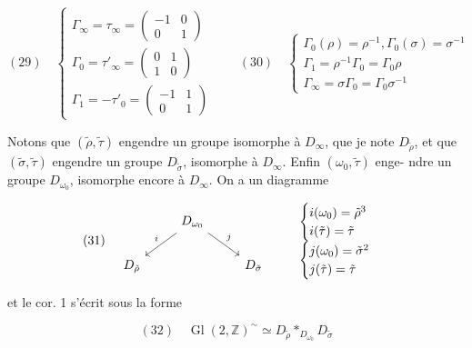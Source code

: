 $$
(29) \quad \begin{cases}
\Gamma_\infty = \tau_\infty = \begin{pmatrix} -1 & 0 \\ 0 & 1 \end{pmatrix} \\
\Gamma_0 = \tau'_\infty = \begin{pmatrix} 0 & 1 \\ 1 & 0 \end{pmatrix} \\
\Gamma_1 = -\tau'_0 = \begin{pmatrix} -1 & 1 \\ 0 & 1 \end{pmatrix}
\end{cases}
\qquad
(30) \quad \begin{cases}
\Gamma_0(\rho) = \rho^{-1}, \Gamma_0(\sigma) = \sigma^{-1} \\
\Gamma_1 = \rho^{-1} \Gamma_0 = \Gamma_0 \rho \\
\Gamma_\infty = \sigma \Gamma_0 = \Gamma_0 \sigma^{-1}
\end{cases}
$$

Notons que $(\tilde{\rho}, \tilde{\tau})$ engendre un groupe
isomorphe à $D_\infty$, que je note $D_{\tilde{\rho}}$,
et que $(\tilde{\sigma}, \tilde{\tau})$ engendre un groupe $D_{\tilde{\sigma}}$,
isomorphe à $D_\infty$. Enfin $(\omega_0, \tilde{\tau})$ enge-
ndre un groupe $D_{\omega_0}$, isomorphe encore
à $D_\infty$. On a un diagramme

$$
(31) \quad 
\begin{tikzcd}
& D_{\omega_0} \ar[dl, "i"'] \ar[dr, "j"] & \\
D_{\tilde{\rho}} & & D_{\tilde{\sigma}}
\end{tikzcd}
\qquad
\begin{array}{l}
\begin{cases} i(\omega_0) = \tilde{\rho}^3 \\ i(\tilde{\tau}) = \tilde{\tau} \end{cases} \\
\begin{cases} j(\omega_0) = \tilde{\sigma}^2 \\ j(\tilde{\tau}) = \tilde{\tau} \end{cases}
\end{array}
$$

et le cor. 1 s'écrit sous la forme

$$
(32) \quad \operatorname{Gl}(2, \mathbb{Z})^\sim \simeq D_{\tilde{\rho}} *_{D_{\omega_0}} D_{\tilde{\sigma}}
$$

